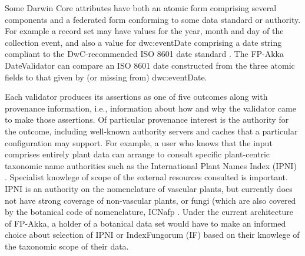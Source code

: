 \documentclass{article}
\begin{document}
Some Darwin Core attributes have both an atomic form comprising several components and a federated form conforming to some data standard or authority.  For example a record set may have values for the year, month and day of the collection event, and also a value for dwc:eventDate comprising a date string compliant to the DwC-recommended ISO 8601 date standard \citep{iso_iso_2004}. 
The FP-Akka DateValidator can compare an ISO 8601 date constructed from the three atomic fields to that given by (or missing from) dwc:eventDate.

Each validator produces its assertions as one of five outcomes along with provenance information, i.e., information about how and why the validator came to make those assertions. Of particular provenance interest is the authority for the outcome, including well-known authority servers and caches that a particular configuration may support.  For example, a user who knows that the  input  comprises entirely plant data can arrange to consult specific plant-centric taxonomic name authorities such as the International Plant Names Index (IPNI) \citep{ipni_international_2012}. 
Specialist knowlege of scope of the external resources consulted is important.  IPNI is an authority on the nomenclature of vascular plants, but currently does not have strong coverage of non-vascular plants, or fungi (which are also covered by the botanical code of nomenclature, ICNafp \citep{ICNafp2012}.  Under the current architecture of FP-Akka, a holder of a botanical data set would have to make an informed choice about selection of IPNI or IndexFungorum (IF) \citep{IF_2015} based on their knowlege of the taxonomic scope of their data.  
\end{document}
